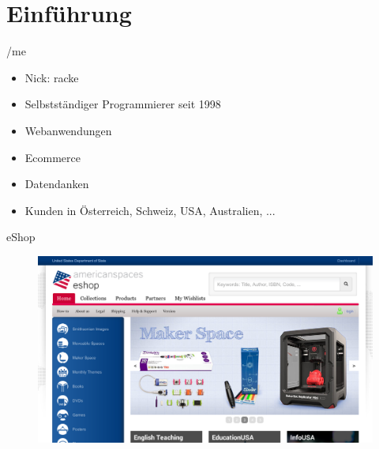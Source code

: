 
\maketitle

\begin{frame}
  \titlepage
\end{frame}

\cleardoublepage

\tableofcontents

\cleardoublepage

\section{Einführung}


\begin{frame}{/me}
\begin{itemize}
\item Nick: racke
\item Selbstständiger Programmierer seit 1998
\item Webanwendungen
\item Ecommerce
\item Datendanken
\item Kunden in Österreich, Schweiz, USA, Australien, ...
\end{itemize}
\end{frame}


\begin{frame}{eShop}
\begin{figure}[!ht]
\centering
\includegraphics[width=1\linewidth]{img/eshop.png}
\end{figure}
\end{frame}

